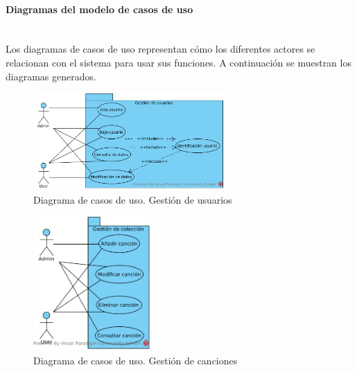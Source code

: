 \paragraph{Diagramas del modelo de casos de uso} \mbox{}\\

Los diagramas de casos de uso representan cómo los diferentes actores se relacionan con el sistema para usar sus funciones. A continuación se muestran los diagramas generados.

\begin{figure}[H]
  \begin{center}
  \includegraphics[width=0.65\textwidth]{../visual_paradigm_uml/CU-1_Gestion_de_usuarios.png}
  \caption{Diagrama de casos de uso. Gestión de usuarios}
  \label{fig:diag_cu_gu}
  \end{center}
\end{figure}

\begin{figure}[H]
  \begin{center}
  \includegraphics[width=0.4\textwidth]{../visual_paradigm_uml/CU-2_Gestion_de_canciones.png}
  \caption{Diagrama de casos de uso. Gestión de canciones}
  \label{fig:diag_cu_gc}
  \end{center}
\end{figure}

